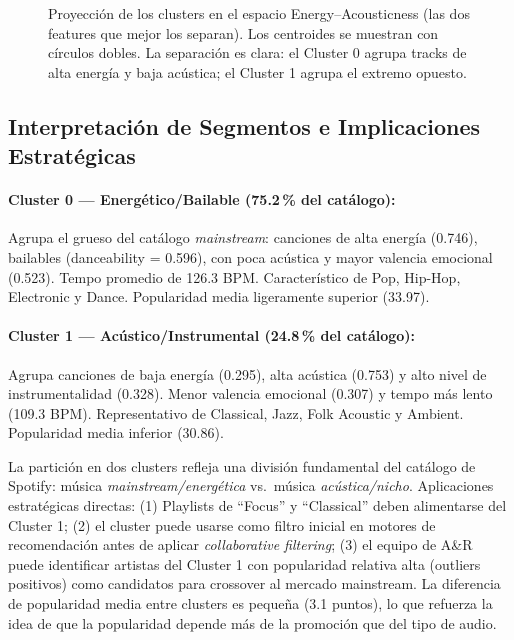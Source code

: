 \documentclass[12pt,a4paper]{article}
\begin{document}
\begin{figure}[H]
\caption{Proyecci\'on de los clusters en el espacio Energy--Acousticness (las dos features
que mejor los separan). Los centroides se muestran con c\'irculos dobles. La separaci\'on
es clara: el Cluster 0 agrupa tracks de alta energ\'ia y baja ac\'ustica; el Cluster 1
agrupa el extremo opuesto.}
\label{fig:clusters}
\end{figure}

\subsection{Interpretaci\'on de Segmentos e Implicaciones Estrat\'egicas}

\paragraph{Cluster 0 --- Energ\'etico/Bailable (75.2\,\% del cat\'alogo):}
Agrupa el grueso del cat\'alogo \textit{mainstream}: canciones de alta energ\'ia (0.746),
bailables (danceability = 0.596), con poca ac\'ustica y mayor valencia emocional (0.523).
Tempo promedio de 126.3 BPM. Caracter\'istico de Pop, Hip-Hop, Electronic y Dance.
Popularidad media ligeramente superior (33.97).

\paragraph{Cluster 1 --- Ac\'ustico/Instrumental (24.8\,\% del cat\'alogo):}
Agrupa canciones de baja energ\'ia (0.295), alta ac\'ustica (0.753) y alto nivel de
instrumentalidad (0.328). Menor valencia emocional (0.307) y tempo m\'as lento (109.3 BPM).
Representativo de Classical, Jazz, Folk Acoustic y Ambient. Popularidad media inferior (30.86).

\begin{ejecutivo}
La partici\'on en dos clusters refleja una divisi\'on fundamental del cat\'alogo de Spotify:
m\'usica \emph{mainstream/energ\'etica} vs.\ m\'usica \emph{ac\'ustica/nicho}.
Aplicaciones estrat\'egicas directas:
(1) Playlists de ``Focus'' y ``Classical'' deben alimentarse del Cluster 1;
(2) el cluster puede usarse como filtro inicial en motores de recomendaci\'on antes de
aplicar \textit{collaborative filtering};
(3) el equipo de A\&R puede identificar artistas del Cluster 1 con popularidad
relativa alta (outliers positivos) como candidatos para crossover al mercado mainstream.
La diferencia de popularidad media entre clusters es peque\~na (3.1 puntos), lo que
refuerza la idea de que la popularidad depende m\'as de la promoci\'on que del tipo de
audio.
\end{ejecutivo}
\end{document}
